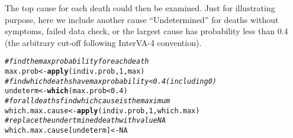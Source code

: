 \documentclass{article}\usepackage[]{graphicx}\usepackage[]{color}
\makeatletter
\newcommand{\hlnum}[1]{\textcolor[rgb]{0.686,0.059,0.569}{#1}}%
\newcommand{\hlcom}[1]{\textcolor[rgb]{0.678,0.584,0.686}{\textit{#1}}}%
\newcommand{\hlopt}[1]{\textcolor[rgb]{0,0,0}{#1}}%
\newcommand{\hlstd}[1]{\textcolor[rgb]{0.345,0.345,0.345}{#1}}%
\newcommand{\hlkwb}[1]{\textcolor[rgb]{0.69,0.353,0.396}{#1}}%
\newcommand{\hlkwd}[1]{\textcolor[rgb]{0.737,0.353,0.396}{\textbf{#1}}}%
\newenvironment{kframe}{%
 \def\at@end@of@kframe{}%
 \ifinner\ifhmode%
  \def\at@end@of@kframe{\end{minipage}}%
  \begin{minipage}{\columnwidth}%
 \fi\fi%
 \def\FrameCommand##1{\hskip\@totalleftmargin \hskip-\fboxsep
 \colorbox{shadecolor}{##1}\hskip-\fboxsep
     \hskip-\linewidth \hskip-\@totalleftmargin \hskip\columnwidth}%
 \MakeFramed {\advance\hsize-\width
   \@totalleftmargin\z@ \linewidth\hsize
   \@setminipage}}%
 {\par\unskip\endMakeFramed%
 \at@end@of@kframe}
\newenvironment{knitrout}{}{} %
\makeatother
\begin{document}
The top cause for each death could then be examined. Just for illustrating purpose, here we include another cause ``Undetermined'' for deaths without symptoms, failed data check, or the largest cause has probability less than $0.4$ (the arbitrary cut-off following InterVA-4 convention). 
\begin{knitrout}
\color{fgcolor}\begin{kframe}
\begin{alltt}
\hlcom{# find the max probability for each death}
\hlstd{max.prob} \hlkwb{<-} \hlkwd{apply}\hlstd{(indiv.prob,} \hlnum{1}\hlstd{, max)}
\hlcom{# find which deaths have max probability < 0.4 (including 0)}
\hlstd{undeterm} \hlkwb{<-} \hlkwd{which}\hlstd{(max.prob} \hlopt{<} \hlnum{0.4}\hlstd{)}
\hlcom{# for all deaths find which cause is the maximum}
\hlstd{which.max.cause} \hlkwb{<-} \hlkwd{apply}\hlstd{(indiv.prob,} \hlnum{1}\hlstd{, which.max)}
\hlcom{# replace the undertmined death with value NA}
\hlstd{which.max.cause[undeterm]} \hlkwb{<-} \hlnum{NA}


\end{alltt}
\end{kframe}
\end{knitrout}
\end{document}
